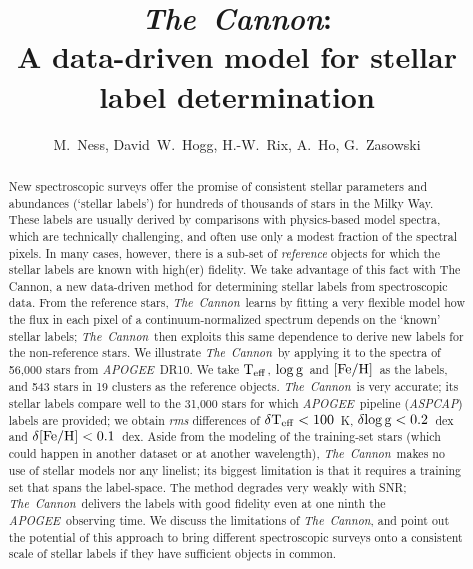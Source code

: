 \documentclass[12pt, preprint]{aastex}
\newcommand{\tc}{\textsl{The~Cannon}}
\newcommand{\apogee}{\textsl{APOGEE}}
\newcommand{\aspcap}{\textsl{ASPCAP}}
\newcommand{\teff}{\mbox{$\rm T_{eff}$}}
\newcommand{\feh}{\mbox{$\rm [Fe/H]$}}
\newcommand{\logg}{\mbox{$\rm \log g$}}
\begin{document}
\title{\tc:\\ A data-driven model for stellar label determination}
\author{M.~Ness,  
David~W.~Hogg, 
H.-W.~Rix, 
A.~Ho, 
G.~Zasowski}

\begin{abstract}%
New spectroscopic surveys offer the promise of consistent stellar
parameters and abundances (`stellar labels') for hundreds of thousands
of stars in the Milky Way. 
These labels are usually derived by comparisons with physics-based
model spectra, which are technically challenging, and often use only a
modest fraction of the spectral pixels. 
In many cases, however, there is a sub-set of \emph{reference}
objects for which the stellar labels are known with high(er)
fidelity. We take advantage of this fact with The Cannon, a new data-driven method for determining 
stellar labels from spectroscopic data. 
From the reference stars, \tc\ learns by fitting a very flexible
model how the flux in each pixel of a continuum-normalized spectrum
depends on the `known' stellar labels; \tc\ then exploits this same
dependence to derive new labels for the non-reference stars.
We illustrate \tc\ by applying it to the spectra of 56,000 stars from
\apogee\ DR10. 
We take \teff, \logg\ and \feh\ as the labels, and 543 stars in 19
clusters as the reference objects. 
\tc\ is very accurate; its stellar labels compare well to the 31,000
stars for which \apogee\ pipeline (\aspcap) labels are provided; we
obtain \textit{rms} differences of $\delta\teff< 100$~K, $\delta\logg< 0.2$~dex
and $\delta\feh< 0.1$~dex.
Aside from the modeling of the training-set stars (which could happen
in another dataset or at another wavelength), \tc\ makes no use of
stellar models nor any linelist; its biggest limitation is that it
requires a training set that spans the label-space. 
The method degrades very weakly with SNR; \tc\ delivers
the labels with good fidelity even at one ninth the
\apogee\ observing time. 
We discuss the limitations of \tc, and point out the potential of this
approach to bring different spectroscopic surveys onto a consistent
scale of stellar labels if they have sufficient objects in common.
\end{abstract}
\end{document}
